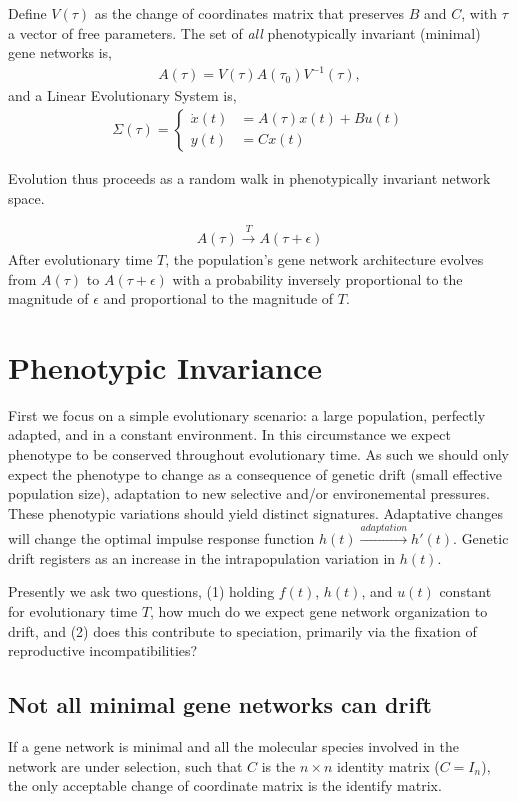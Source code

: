 \documentclass[9 pt]{article}
\newcommand{\1}{\mathbbm{1}}
\begin{document}
\begin{multicols}{2}
  Define $V(\tau)$ as the change of coordinates matrix that preserves $B$ and $C$, with $\tau$ a vector of free parameters. The set of \emph{all} phenotypically invariant (minimal) gene networks is, 
  \begin{align}
    A(\tau) = V(\tau) A(\tau_{0}) V^{-1}(\tau) ,
  \end{align}
  and a Linear Evolutionary System is, 
  \begin{align}
    \Sigma(\tau) = \left\{ \begin{array}{ll} \dot{x}(t) &= A(\tau) x(t) + B u(t) \\ y(t) &= C x(t) \end{array} \right .
  \end{align}
  
  Evolution thus proceeds as a random walk in phenotypically invariant network space. 

  \begin{align}
    A(\tau) \xrightarrow{T} A(\tau + \epsilon)
  \end{align}
  After evolutionary time $T$, the population's gene network architecture evolves from $A(\tau)$ to $A(\tau + \epsilon)$ with a probability inversely proportional to the magnitude of $\epsilon$ and proportional to the magnitude of $T$. 

  \section*{Phenotypic Invariance}
    First we focus on a simple evolutionary scenario: a large population, perfectly adapted, and in a constant environment. In this circumstance we expect phenotype to be conserved throughout evolutionary time. As such we should only expect the phenotype to change as a consequence of genetic drift (small effective population size), adaptation to new selective and/or environemental pressures. These phenotypic variations should yield distinct signatures. Adaptative changes will change the optimal impulse response function $h(t) \xrightarrow{adaptation} h'(t)$. Genetic drift registers as an increase in the intrapopulation variation in $h(t)$. 
    
    Presently we ask two questions, (1) holding $f(t)$, $h(t)$, and $u(t)$ constant for evolutionary time $T$, how much do we expect gene network organization to drift, and (2) does this contribute to speciation, primarily via the fixation of reproductive incompatibilities?

    \subsection*{Not all minimal gene networks can drift}
      If a gene network is minimal and all the molecular species involved in the network are under selection, such that $C$ is the $n \times n$ identity matrix  ($C = I_{n}$), the only acceptable  change of coordinate matrix is the identify matrix.
     

\end{multicols}
\end{document}

